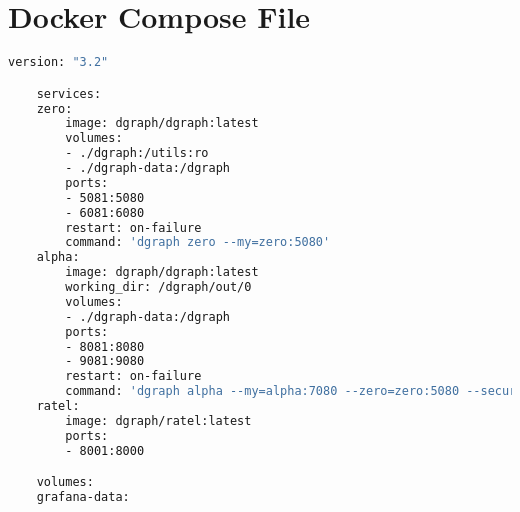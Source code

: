 \chapter{Docker Compose File}
\label{appendix:docker-compose-dgraph}

\begin{lstlisting}[language=bash]
    version: "3.2"

    services:
    zero:
        image: dgraph/dgraph:latest
        volumes:
        - ./dgraph:/utils:ro
        - ./dgraph-data:/dgraph
        ports:
        - 5081:5080
        - 6081:6080
        restart: on-failure
        command: 'dgraph zero --my=zero:5080'
    alpha:
        image: dgraph/dgraph:latest
        working_dir: /dgraph/out/0
        volumes:
        - ./dgraph-data:/dgraph
        ports:
        - 8081:8080
        - 9081:9080
        restart: on-failure
        command: 'dgraph alpha --my=alpha:7080 --zero=zero:5080 --security whitelist=0.0.0.0/0 --badger="compression=snappy; numgoroutines=64;" '
    ratel:
        image: dgraph/ratel:latest
        ports:
        - 8001:8000

    volumes:
    grafana-data:
\end{lstlisting}